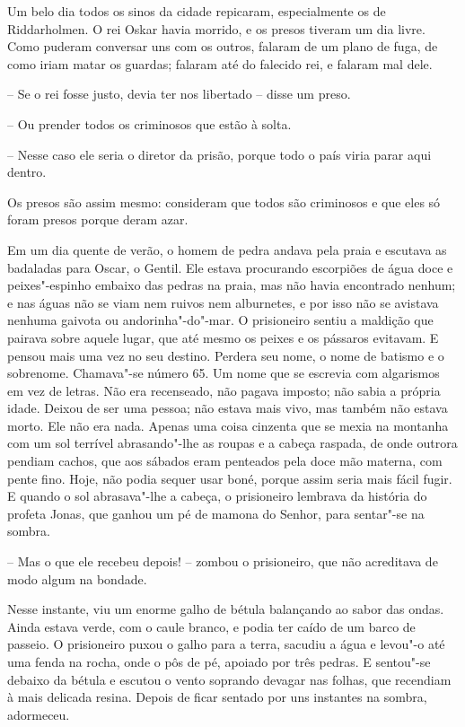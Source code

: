 Um belo dia todos os sinos da cidade repicaram, especialmente os de
Riddarholmen. O rei Oskar havia morrido, e os presos tiveram um dia
livre. Como puderam conversar uns com os outros, falaram de um plano de
fuga, de como iriam matar os guardas; falaram até do falecido rei, e
falaram mal dele.

-- Se o rei fosse justo, devia ter nos libertado -- disse um preso.

-- Ou prender todos os criminosos que estão à solta.

-- Nesse caso ele seria o diretor da prisão, porque todo o país viria
parar aqui dentro.

Os presos são assim mesmo: consideram que todos são criminosos e que
eles só foram presos porque deram azar.

Em um dia quente de verão, o homem de pedra andava pela praia e escutava
as badaladas para Oscar, o Gentil. Ele estava procurando escorpiões de
água doce e peixes"-espinho embaixo das pedras na praia, mas não havia
encontrado nenhum; e nas águas não se viam nem ruivos nem alburnetes, e
por isso não se avistava nenhuma gaivota ou andorinha"-do"-mar. O
prisioneiro sentiu a maldição que pairava sobre aquele lugar, que até
mesmo os peixes e os pássaros evitavam. E pensou mais uma vez no seu
destino. Perdera seu nome, o nome de batismo e o sobrenome.
Chamava"-se número 65. Um nome que se escrevia com algarismos em vez
de letras. Não era recenseado, não pagava imposto; não sabia a própria
idade. Deixou de ser uma pessoa; não estava mais vivo, mas também não
estava morto. Ele não era nada. Apenas uma coisa cinzenta que se mexia
na montanha com um sol terrível abrasando"-lhe as roupas e a cabeça
raspada, de onde outrora pendiam cachos, que aos sábados eram penteados
pela doce mão materna, com pente fino. Hoje, não podia sequer usar
boné, porque assim seria mais fácil fugir. E quando o sol
abrasava"-lhe a cabeça, o prisioneiro lembrava da história do profeta
Jonas, que ganhou um pé de mamona do Senhor, para sentar"-se na
sombra.

-- Mas o que ele recebeu depois! -- zombou o prisioneiro, que não
acreditava de modo algum na bondade.

Nesse instante, viu um enorme galho de bétula balançando ao sabor das
ondas. Ainda estava verde, com o caule branco, e podia ter caído de um
barco de passeio. O prisioneiro puxou o galho para a terra, sacudiu a
água e levou"-o até uma fenda na rocha, onde o pôs de pé, apoiado por
três pedras. E sentou"-se debaixo da bétula e escutou o vento soprando
devagar nas folhas, que recendiam à mais delicada resina. Depois de
ficar sentado por uns instantes na sombra, adormeceu.

